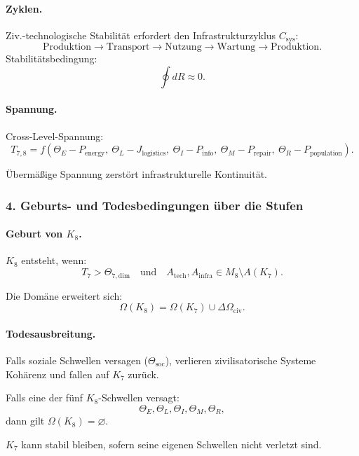 \paragraph{Zyklen.}
Ziv.-technologische Stabilität erfordert den Infrastrukturzyklus $C_{\mathrm{sys}}$:
\[
\text{Produktion} \rightarrow \text{Transport} \rightarrow
\text{Nutzung} \rightarrow \text{Wartung} \rightarrow \text{Produktion}.
\]
Stabilitätsbedingung:
\[
\oint dR \approx 0.
\]

\paragraph{Spannung.}
Cross-Level-Spannung:
\[
T_{7,8} =
f(\Theta_E - P_{\mathrm{energy}},\
  \Theta_L - J_{\mathrm{logistics}},\
  \Theta_I - P_{\mathrm{info}},\
  \Theta_M - P_{\mathrm{repair}},\
  \Theta_R - P_{\mathrm{population}}).
\]

Übermäßige Spannung zerstört infrastrukturelle Kontinuität.

\subsubsection{4. Geburts- und Todesbedingungen über die Stufen}

\paragraph{Geburt von \texorpdfstring{$K_8$}{K_8}.}
$K_8$ entsteht, wenn:
\[
T_7 > \Theta_{7,\mathrm{dim}}
\quad\text{und}\quad
A_{\mathrm{tech}}, A_{\mathrm{infra}} \in M_8 \setminus A(K_7).
\]

Die Domäne erweitert sich:
\[
\Omega(K_8) = \Omega(K_7) \cup \Delta\Omega_{\mathrm{civ}}.
\]

\paragraph{Todesausbreitung.}
Falls soziale Schwellen versagen ($\Theta_{\mathrm{soc}}$), verlieren
zivilisatorische Systeme Kohärenz und fallen auf $K_7$ zurück.

Falls eine der fünf $K_8$-Schwellen versagt:
\[
\Theta_E,\Theta_L,\Theta_I,\Theta_M,\Theta_R,
\]
dann gilt $\Omega(K_8)=\varnothing$.

$K_7$ kann stabil bleiben, sofern seine eigenen Schwellen nicht verletzt sind.


